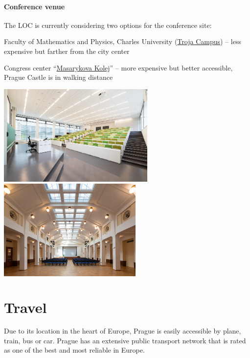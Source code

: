 \documentclass[12pt]{extarticle}
\newcommand*\sq{\mathbin{\vcenter{\hbox{\rule{.8ex}{.8ex}}}}}
\newenvironment{t_sq_itemize}
{\begin{itemize}[topsep=0pt, parsep=0pt, itemsep=0pt, leftmargin=*]
    \renewcommand{\labelitemi}{{\(\sq\)}}}
  {\end{itemize}}
\begin{document}
\paragraph{Conference venue} The LOC is currently considering two
options for the conference site:
\begin{t_sq_itemize}
\item
  Faculty of Mathematics and Physics, Charles University
  (\href{https://maps.app.goo.gl/YLm43Nb5XHHziMX16}{Troja Campus})
  -- less expensive but farther from the city center
  \item Congress center ``\href{https://www.masarykovakolej.cz/en/im-organizing-event}{Masarykova Kolej}'' -- more expensive but better
    accessible, Prague Castle is in walking distance
  \end{t_sq_itemize}
  \begin{center}
    \includegraphics[height=5cm]{Impakt-troja_1}
    \hspace{7mm}
    \includegraphics[height=5cm]{MK}\\[-1.5mm]
    \hspace{3mm}{\small Troja Campus}\hspace{5.4cm}{\small Masarykova Kolej}
  \end{center}

\section*{Travel}
\noindent
Due to its location in the heart of Europe, Prague is easily
accessible by plane, train, bus or car. Prague has an extensive public
transport network that is rated as one of the best and most reliable
in Europe.
\end{document}
